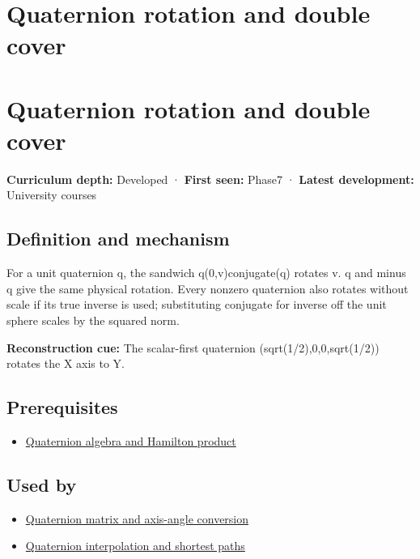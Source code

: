 \hypertarget{appendix-8e61ab68f6b2}{}
\section*{Quaternion rotation and double cover}
\section{Quaternion rotation and double cover}\label{quaternion-rotation-and-double-cover}

\textbf{Curriculum depth:} Developed · \textbf{First seen:} Phase7 · \textbf{Latest development:} University courses

\subsection{Definition and mechanism}\label{definition-and-mechanism}

For a unit quaternion q, the sandwich q(0,v)conjugate(q) rotates v. q and minus q give the same physical rotation. Every nonzero quaternion also rotates without scale if its true inverse is used; substituting conjugate for inverse off the unit sphere scales by the squared norm.

\textbf{Reconstruction cue:} The scalar-first quaternion (sqrt(1/2),0,0,sqrt(1/2)) rotates the X axis to Y.

\subsection{Prerequisites}\label{prerequisites}

\begin{itemize}
\tightlist
\item
  \hyperref[appendix-965d9260eeab]{Quaternion algebra and Hamilton product}
\end{itemize}

\subsection{Used by}\label{used-by}

\begin{itemize}
\tightlist
\item
  \hyperref[appendix-26d8da71f6c4]{Quaternion matrix and axis-angle conversion}
\item
  \hyperref[appendix-9b4b8254f26b]{Quaternion interpolation and shortest paths}
\end{itemize}

